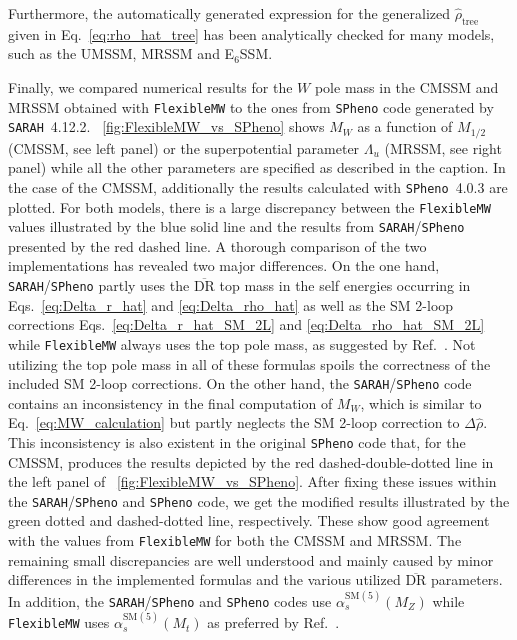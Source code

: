 \documentclass[final,3p,11pt,pdflatex]{elsarticle}
\makeatletter
\newcommand{\sarah}{\texttt{SARAH}\@\xspace}
\newcommand{\spheno}{\texttt{SPheno}\@\xspace}
\newcommand{\fmw}{\texttt{FlexibleMW}\@\xspace}
\newcommand{\ESSM}{E$_6$SSM\@\xspace}
\newcommand{\ol}[1]{\overline{#1}}
\newcommand{\DRbar}{\ensuremath{\ol{\text{DR}}}\xspace}
\newcommand{\SM}{\ensuremath{\text{SM}}\xspace}
\newcommand{\figref}[1]{\figurename~\ref{#1}}
\newcommand{\mhalf}{\ensuremath{M_{1/2}}\xspace}
\def\as{\alpha_s}
\makeatother
\begin{document}
Furthermore, the automatically generated expression for the
generalized $\hat\rho_\text{tree}$ given in Eq.~\eqref{eq:rho_hat_tree}
has been analytically checked for many models, such as the UMSSM,
MRSSM and \ESSM.

Finally, we compared numerical results for the $W$ pole mass in the
CMSSM and MRSSM obtained with \fmw to the ones from \spheno code
generated by \sarah~4.12.2. \figref{fig:FlexibleMW_vs_SPheno} shows $M_W$
as a function of $\mhalf$ (CMSSM, see left panel) or the superpotential
parameter $\Lambda_u$ (MRSSM, see right panel) while all
the other parameters are specified as described in the caption.
In the case of the CMSSM, additionally the results calculated with
\spheno~4.0.3 are plotted. For both models, there is a large
discrepancy between the \fmw values illustrated by the blue solid
line and the results from \sarah/\spheno presented by the red dashed
line. A thorough comparison of the two implementations has revealed
two major differences. On the one hand, \sarah/\spheno partly uses the
\DRbar top mass in the self energies occurring in
Eqs.~\eqref{eq:Delta_r_hat} and \eqref{eq:Delta_rho_hat} as well as
the SM 2-loop corrections Eqs.~\eqref{eq:Delta_r_hat_SM_2L} and
\eqref{eq:Delta_rho_hat_SM_2L} while \fmw always uses the top pole mass,
as suggested by Ref.~\cite{Fanchiotti:1992tu}. Not utilizing the top
pole mass in all of these formulas spoils the correctness of the
included SM 2-loop corrections. On the other hand, the
\sarah/\spheno code contains an inconsistency in the final computation of
$M_W$, which is similar to Eq.~\eqref{eq:MW_calculation} but partly
neglects the SM 2-loop correction to $\Delta\hat\rho$.
This inconsistency is also existent in the original \spheno code that,
for the CMSSM, produces the results depicted by the red dashed-double-dotted
line in the left panel of \figref{fig:FlexibleMW_vs_SPheno}.
After fixing these issues within the \sarah/\spheno and \spheno code,
we get the modified results illustrated by the green dotted and
dashed-dotted line, respectively. These show good agreement with the
values from \fmw for both the CMSSM and MRSSM.
The remaining small discrepancies are well
understood and mainly caused by minor differences in the implemented
formulas and the various utilized \DRbar parameters. In addition,
the \sarah/\spheno and \spheno codes use $\as^{\SM(5)}(M_Z)$ while \fmw uses
$\as^{\SM(5)}(M_t)$ as preferred by Ref.~\cite{Fanchiotti:1992tu}.
%
\end{document}
